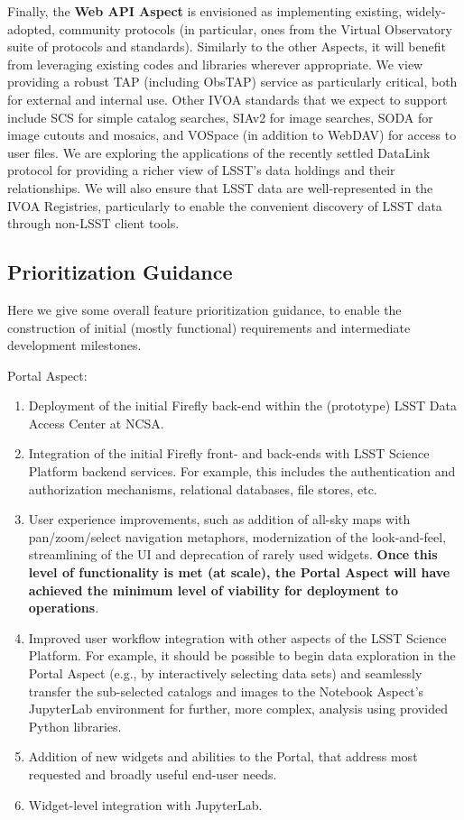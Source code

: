 Finally, the \textbf{Web API Aspect} is envisioned as implementing existing, widely-adopted, community protocols (in particular, ones from the Virtual Observatory suite of protocols and standards).
Similarly to the other Aspects, it will benefit from leveraging existing codes and libraries wherever appropriate.
We view providing a robust TAP (including ObsTAP) service as particularly critical, both for external and internal use.
Other IVOA standards that we expect to support include SCS for simple catalog searches, SIAv2 for image searches, SODA for image cutouts and mosaics, and VOSpace (in addition to WebDAV) for access to user files.
We are exploring the applications of the recently settled DataLink protocol for providing a richer view of LSST's data holdings and their relationships.
We will also ensure that LSST data are well-represented in the IVOA Registries, particularly to enable the convenient discovery of LSST data through non-LSST client tools.

\subsection{Prioritization Guidance}

Here we give some overall feature prioritization guidance, to enable the construction of initial (mostly functional) requirements and intermediate development milestones.

Portal Aspect:
\begin{enumerate}
	\item Deployment of the initial Firefly back-end within the (prototype) LSST Data Access Center at NCSA.
	\item Integration of the initial Firefly front- and back-ends with LSST Science Platform backend services. For example, this includes the authentication and authorization mechanisms, relational databases, file stores, etc.
	\item User experience improvements, such as addition of all-sky maps with pan/zoom/select navigation metaphors, modernization of the look-and-feel, streamlining of the UI and deprecation of rarely used widgets. \textbf{Once this level of functionality is met (at scale), the Portal Aspect will have achieved the minimum level of viability for deployment to operations}.
	\item Improved user workflow integration with other aspects of the LSST Science Platform. For example, it should be possible to begin data exploration in the Portal Aspect (e.g., by interactively selecting data sets) and seamlessly transfer the sub-selected catalogs and images to the Notebook Aspect's JupyterLab environment for further, more complex, analysis using provided Python libraries.
	\item Addition of new widgets and abilities to the Portal, that address most requested and broadly useful end-user needs.
	\item Widget-level integration with JupyterLab.
\end{enumerate}

